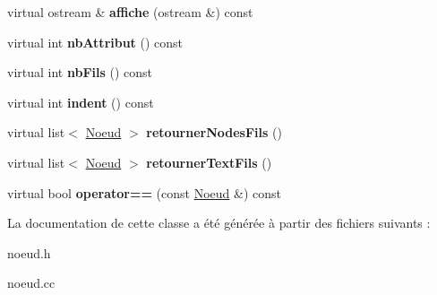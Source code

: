 \begin{DoxyCompactItemize}
\item 
\hypertarget{classNoeud_a6780e6e2b0a251ba12cca49432043bd7}{
virtual ostream \& {\bfseries affiche} (ostream \&) const }
\label{classNoeud_a6780e6e2b0a251ba12cca49432043bd7}

\item 
\hypertarget{classNoeud_a84fbd72cb471bc239ba6f8333db40a28}{
virtual int {\bfseries nbAttribut} () const }
\label{classNoeud_a84fbd72cb471bc239ba6f8333db40a28}

\item 
\hypertarget{classNoeud_a4e7c9b2370e3cb38eb17d76242ea61ef}{
virtual int {\bfseries nbFils} () const }
\label{classNoeud_a4e7c9b2370e3cb38eb17d76242ea61ef}

\item 
\hypertarget{classNoeud_a99a1ea747bffbb71d1e503b6c7ab7a2d}{
virtual int {\bfseries indent} () const }
\label{classNoeud_a99a1ea747bffbb71d1e503b6c7ab7a2d}

\item 
\hypertarget{classNoeud_a35d193d8ac74ec15781500a7efcf2401}{
virtual list$<$ \hyperlink{classNoeud}{Noeud} $>$ {\bfseries retournerNodesFils} ()}
\label{classNoeud_a35d193d8ac74ec15781500a7efcf2401}

\item 
\hypertarget{classNoeud_a9cff8c418007ae84f96eff320fa5e673}{
virtual list$<$ \hyperlink{classNoeud}{Noeud} $>$ {\bfseries retournerTextFils} ()}
\label{classNoeud_a9cff8c418007ae84f96eff320fa5e673}

\item 
\hypertarget{classNoeud_a5cb2e3351e1e4f73e183c759a6eb3fd1}{
virtual bool {\bfseries operator==} (const \hyperlink{classNoeud}{Noeud} \&) const }
\label{classNoeud_a5cb2e3351e1e4f73e183c759a6eb3fd1}

\end{DoxyCompactItemize}


La documentation de cette classe a été générée à partir des fichiers suivants :\begin{DoxyCompactItemize}
\item 
noeud.h\item 
noeud.cc\end{DoxyCompactItemize}
